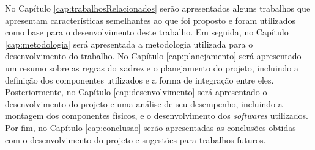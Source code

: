 No Capítulo \ref{cap:trabalhosRelacionados} serão apresentados alguns trabalhos que apresentam características semelhantes ao que foi proposto e foram utilizados como base para o desenvolvimento deste trabalho.
Em seguida, no Capítulo \ref{cap:metodologia} será apresentada a metodologia utilizada para o desenvolvimento do trabalho.
No Capítulo \ref{cap:planejamento} será apresentado um resumo sobre as regras do xadrez e o planejamento do projeto, incluindo a definição dos componentes utilizados e a forma de integração entre eles.
Posteriormente, no Capítulo \ref{cap:desenvolvimento} será apresentado o desenvolvimento do projeto e uma análise de seu desempenho, incluindo a montagem dos componentes físicos, e o desenvolvimento dos \textit{softwares} utilizados.
Por fim, no Capítulo \ref{cap:conclusao} serão apresentadas as conclusões obtidas com o desenvolvimento do projeto e sugestões para trabalhos futuros.
